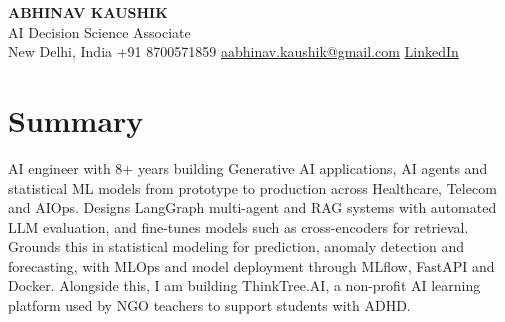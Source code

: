 \documentclass[10pt,a4paper]{article}
\begin{document}
\begin{center}
  {\LARGE\bfseries ABHINAV KAUSHIK}\\[2pt]
  {\large AI Decision Science Associate}\\[2pt]
  New Delhi, India \textbar{} +91 8700571859 \textbar{} \href{mailto:aabhinav.kaushik@gmail.com}{aabhinav.kaushik@gmail.com} \textbar{} \href{https://www.linkedin.com/in/abhinav-kaushik10/}{LinkedIn}  
\end{center}

\section{Summary}
AI engineer with 8+ years building Generative AI applications, AI agents and statistical ML models from prototype to production across Healthcare, Telecom and AIOps. Designs LangGraph multi-agent and RAG systems with automated LLM evaluation, and fine-tunes models such as cross-encoders for retrieval. Grounds this in statistical modeling for prediction, anomaly detection and forecasting, with MLOps and model deployment through MLflow, FastAPI and Docker. Alongside this, I am building ThinkTree.AI, a non-profit AI learning platform used by NGO teachers to support students with ADHD.
\end{document}
